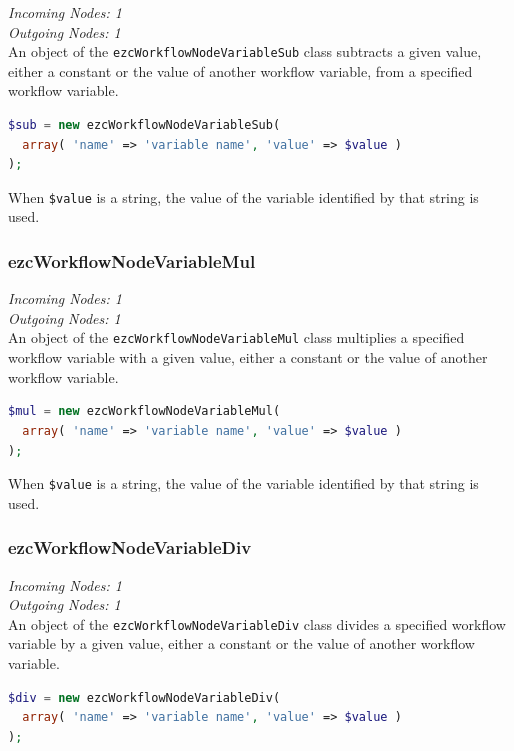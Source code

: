 \emph{Incoming Nodes: 1}\\
\emph{Outgoing Nodes: 1}\\

An object of the \texttt{ezcWorkflowNodeVariableSub} class subtracts a given
value, either a constant or the value of another workflow variable, from a
specified workflow variable.

\begin{lstlisting}[language=PHP]
$sub = new ezcWorkflowNodeVariableSub(
  array( 'name' => 'variable name', 'value' => $value )
);
\end{lstlisting}

When \texttt{\$value} is a string, the value of the variable identified by
that string is used.

\subsubsection{ezcWorkflowNodeVariableMul}

\emph{Incoming Nodes: 1}\\
\emph{Outgoing Nodes: 1}\\

An object of the \texttt{ezcWorkflowNodeVariableMul} class multiplies a specified
workflow variable with a given value, either a constant or the value of another
workflow variable.

\begin{lstlisting}[language=PHP]
$mul = new ezcWorkflowNodeVariableMul(
  array( 'name' => 'variable name', 'value' => $value )
);
\end{lstlisting}

When \texttt{\$value} is a string, the value of the variable identified by
that string is used.

\subsubsection{ezcWorkflowNodeVariableDiv}

\emph{Incoming Nodes: 1}\\
\emph{Outgoing Nodes: 1}\\

An object of the \texttt{ezcWorkflowNodeVariableDiv} class divides a specified
workflow variable by a given value, either a constant or the value of another
workflow variable.

\begin{lstlisting}[language=PHP]
$div = new ezcWorkflowNodeVariableDiv(
  array( 'name' => 'variable name', 'value' => $value )
);
\end{lstlisting}

